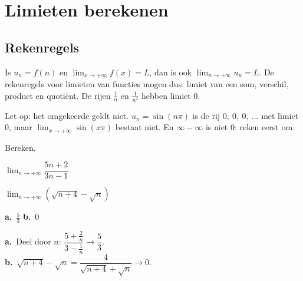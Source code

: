 \section{Limieten berekenen}

\subsection{Rekenregels}

\begin{theorie}
Is $u_n = f(n)$ en $\displaystyle\lim_{x\to+\infty} f(x) = L$, dan is ook $\displaystyle\lim_{n\to+\infty} u_n = L$. De rekenregels voor limieten van functies mogen dus: limiet van een som, verschil, product en quotiënt. De rijen $\tfrac1n$ en $\tfrac{1}{n^2}$ hebben limiet 0.
\end{theorie}

Let op: het omgekeerde geldt niet. $u_n = \sin(n\pi)$ is de rij $0,\ 0,\ 0,\ \ldots$ met limiet 0, maar $\displaystyle\lim_{x\to+\infty} \sin(x\pi)$ bestaat niet. En $\infty - \infty$ is niet 0: reken eerst om.



\begin{oefeningen}
\begin{oefening}
Bereken.
\begin{reeks}[2]
  \item $\displaystyle\lim_{n\to+\infty} \dfrac{5n + 2}{3n - 1}$
  \item $\displaystyle\lim_{n\to+\infty} \left(\sqrt{n+4} - \sqrt{n}\right)$
\end{reeks}
\begin{solution}
\textbf{a.}~$\tfrac53$ \quad \textbf{b.}~0
\end{solution}
\begin{fullsolution}
\textbf{a.}~Deel door $n$: $\dfrac{5+\tfrac2n}{3-\tfrac1n}\to\dfrac53$.\\
\textbf{b.}~$\sqrt{n+4}-\sqrt{n}=\dfrac{4}{\sqrt{n+4}+\sqrt{n}}\to 0$.
\end{fullsolution}
\end{oefening}
\end{oefeningen}

